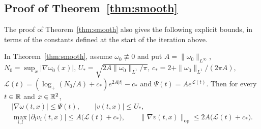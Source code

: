 \subsection{Proof of Theorem~\ref{thm:smooth}}

The proof of Theorem~\ref{thm:smooth} also gives the following explicit bounds,
in terms of the constants defined at the start of the iteration above.

\begin{lemma}
\label{lem:smooth-bounds}
In Theorem~\ref{thm:smooth}, assume $\omega_0\not\equiv0$ and put
$A=\|\omega_0\|_{L^\infty}$, $N_0=\sup_x|\nabla\omega_0(x)|$,
$U_*=\sqrt{2A\|\omega_0\|_{L^1}/\pi}$, $c_*=2+\|\omega_0\|_{L^1}/(2\pi A)$,
$\mathcal L(t)=(\log_+(N_0/A)+c_*)e^{2A|t|}-c_*$ and $\Psi(t)=Ae^{\mathcal L(t)}$.
Then for every $t\in\mathbb{R}$ and $x\in\mathbb{R}^2$,
\begin{gather*}
|\nabla\omega(t,x)|\le\Psi(t),\qquad|v(t,x)|\le U_*,\\
\max_{i,l}|\partial_lv_i(t,x)|\le A\big(\mathcal L(t)+c_*\big),\qquad
\|\nabla v(t,x)\|_{\mathrm{op}}\le2A\big(\mathcal L(t)+c_*\big).
\end{gather*}
\end{lemma}

